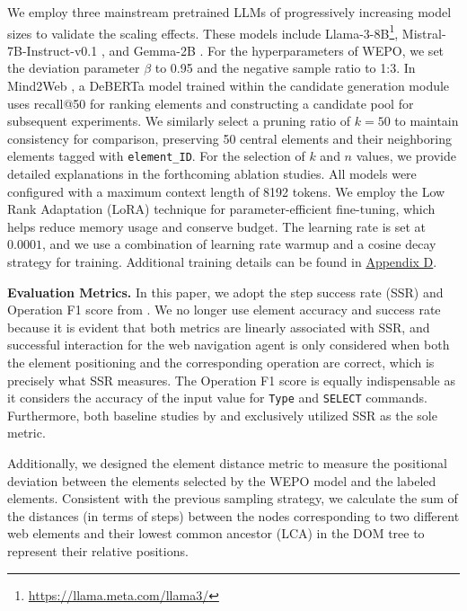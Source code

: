 \documentclass{article}
\begin{document}
  We employ three mainstream pretrained LLMs of progressively increasing model sizes to validate the scaling effects. These models include Llama-3-8B\footnote{\url{https://llama.meta.com/llama3/}}, Mistral-7B-Instruct-v0.1 \citep{jiang2023mistral}, and Gemma-2B \citep{team2024gemma}. For the hyperparameters of WEPO, we set the deviation parameter \(\beta\) to 0.95 and the negative sample ratio to 1:3. In Mind2Web \citep{deng2024mind2web}, a DeBERTa \citep{he2020deberta} model trained within the candidate generation module uses recall@50 for ranking elements and constructing a candidate pool for subsequent experiments. We similarly select a pruning ratio of \(k = 50\) to maintain consistency for comparison, preserving 50 central elements and their neighboring elements tagged with \texttt{element\_ID}. For the selection of \( k \) and \( n \) values, we provide detailed explanations in the forthcoming ablation studies. All models were configured with a maximum context length of 8192 tokens. We employ the Low Rank Adaptation (LoRA) technique \citep{hu2021lora} for parameter-efficient fine-tuning, which helps reduce memory usage and conserve budget. The learning rate is set at $0.0001$, and we use a combination of learning rate warmup and a cosine decay strategy for training. Additional training details can be found in \hyperref[sec:detail]{Appendix D}.
    
  \textbf{Evaluation Metrics.} In this paper, we adopt the step success rate (SSR) and Operation F1 score from \citet{deng2024mind2web}. We no longer use element accuracy and success rate because it is evident that both metrics are linearly associated with SSR, and successful interaction for the web navigation agent is only considered when both the element positioning and the corresponding operation are correct, which is precisely what SSR measures. The Operation F1 score is equally indispensable as it considers the accuracy of the input value for \texttt{Type} and \texttt{SELECT} commands. Furthermore, both baseline studies by \citet{gur2023real} and \citet{hong2023cogagent} exclusively utilized SSR as the sole metric.
    
  Additionally, we designed the element distance metric to measure the positional deviation between the elements selected by the WEPO model and the labeled elements. Consistent with the previous sampling strategy, we calculate the sum of the distances (in terms of steps) between the nodes corresponding to two different web elements and their lowest common ancestor (LCA) in the DOM tree to represent their relative positions.
\end{document}
